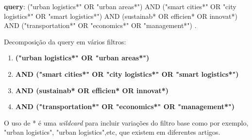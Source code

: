 \documentclass[
MEECAS,			%
portuguese,		%
]{DEEclass}
\author{Eduardo Miguel Moreira Junqueira}
\begin{document}
		






\renewcommand{\checktoopen}{%
  \clearpage
  \ifdef{\phantomsection}{\phantomsection}{}
}


						


%




\beginannexes

\label{anexo:base_dados_resultados_query}
\textbf{\gls{query}}: ("urban logistics*" OR "urban areas*") AND ("smart cities*" OR "city logistics*" OR "smart logistics*") AND (sustainab* OR efficien* OR innovat*) AND ("transportation*" OR "economics*" OR "management*") \cite{JunqueiraDevEduardoRepositório}.

Decomposição da \gls{query} em vários filtros:

\begin{enumerate}
    \item\textbf{("urban logistics*" OR "urban areas*")}
    \item \textbf{AND ("smart cities*" OR "city logistics*" OR "smart logistics*")}
    \item \textbf{AND (sustainab* OR efficien* OR innovat*)}
    \item \textbf{AND ("transportation*" OR "economics*" OR "management*")}
\end{enumerate}
O uso de * é uma \textit{wildcard} para incluir variações do filtro base como por exemplo,  "urban logistics", "urban logistics",etc, que existem em diferentes artigos.
\label{anexo:figuras_complementares_wos}
\end{document}
